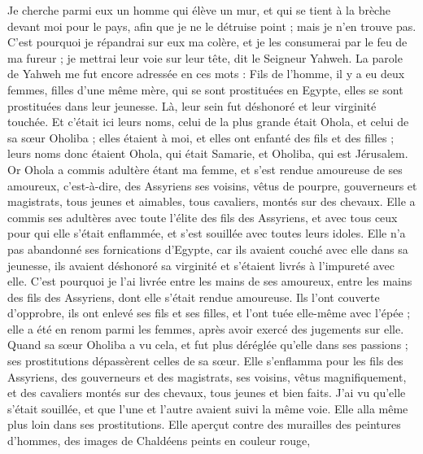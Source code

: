\begin{multicols}{2}
Je cherche parmi eux un homme qui élève un mur, et qui se tient à la brèche devant moi pour le pays, afin que je ne le détruise point ; mais je n'en trouve pas.
C'est pourquoi je répandrai sur eux ma colère, et je les consumerai par le feu de ma fureur ; je mettrai leur voie sur leur tête, dit le Seigneur Yahweh.
\VerseOne{}La parole de Yahweh me fut encore adressée en ces mots :
Fils de l'homme, il y a eu deux femmes, filles d'une même mère,
qui se sont prostituées en Egypte, elles se sont prostituées dans leur jeunesse. Là, leur sein fut déshonoré et leur virginité touchée.
Et c'était ici leurs noms, celui de la plus grande était Ohola, et celui de sa sœur Oholiba ; elles étaient à moi, et elles ont enfanté des fils et des filles ; leurs noms donc étaient Ohola, qui était Samarie, et Oholiba, qui est Jérusalem.
Or Ohola a commis adultère étant ma femme, et s'est rendue amoureuse de ses amoureux, c'est-à-dire, des Assyriens ses voisins,
vêtus de pourpre, gouverneurs et magistrats, tous jeunes et aimables, tous cavaliers, montés sur des chevaux.
Elle a commis ses adultères avec toute l'élite des fils des Assyriens, et avec tous ceux pour qui elle s'était enflammée, et s'est souillée avec toutes leurs idoles.
Elle n'a pas abandonné ses fornications d'Egypte, car ils avaient couché avec elle dans sa jeunesse, ils avaient déshonoré sa virginité et s'étaient livrés à l'impureté avec elle.
C'est pourquoi je l'ai livrée entre les mains de ses amoureux, entre les mains des fils des Assyriens, dont elle s'était rendue amoureuse.
Ils l'ont couverte d'opprobre, ils ont enlevé ses fils et ses filles, et l'ont tuée elle-même avec l'épée ; elle a été en renom parmi les femmes, après avoir exercé des jugements sur elle.
Quand sa sœur Oholiba a vu cela, et fut plus déréglée qu'elle dans ses passions ; ses prostitutions dépassèrent celles de sa sœur.
Elle s'enflamma pour les fils des Assyriens, des gouverneurs et des magistrats, ses voisins, vêtus magnifiquement, et des cavaliers montés sur des chevaux, tous jeunes et bien faits.
J'ai vu qu'elle s'était souillée, et que l'une et l'autre avaient suivi la même voie.
Elle alla même plus loin dans ses prostitutions. Elle aperçut contre des murailles des peintures d'hommes, des images de Chaldéens peints en couleur rouge,

\end{multicols}
